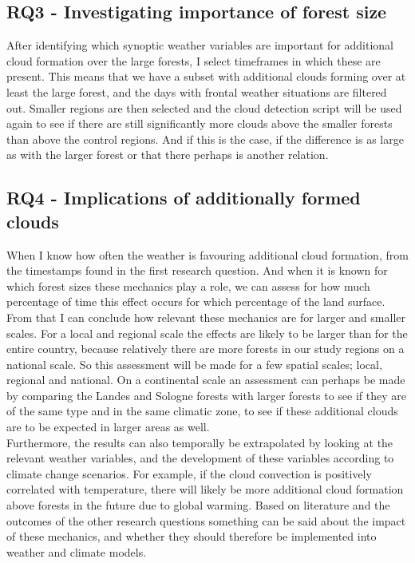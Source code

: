 \documentclass{article}
\begin{document}
\subsection{RQ3 - Investigating importance of forest size}
After identifying which synoptic weather variables are important for additional cloud formation over the large forests, I select timeframes in which these are present. This means that we have a subset with additional clouds forming over at least the large forest, and the days with frontal weather situations are filtered out. Smaller regions are then selected and the cloud detection script will be used again to see if there are still significantly more clouds above the smaller forests than above the control regions. And if this is the case, if the difference is as large as with the larger forest or that there perhaps is another relation.

\subsection{RQ4 - Implications of additionally formed clouds}
When I know how often the weather is favouring additional cloud formation, from the timestamps found in the first research question. And when it is known for which forest sizes these mechanics play a role, we can assess for how much percentage of time this effect occurs for which percentage of the land surface. From that I can conclude how relevant these mechanics are for larger and smaller scales. For a local and regional scale the effects are likely to be larger than for the entire country, because relatively there are more forests in our study regions on a national scale. So this assessment will be made for a few spatial scales; local, regional and national. On a continental scale an assessment can perhaps be made by comparing the Landes and Sologne forests with larger forests to see if they are of the same type and in the same climatic zone, to see if these additional clouds are to be expected in larger areas as well.\\

Furthermore, the results can also temporally be extrapolated by looking at the relevant weather variables, and the development of these variables according to climate change scenarios. For example, if the cloud convection is positively correlated with temperature, there will likely be more additional cloud formation above forests in the future due to global warming. Based on literature and the outcomes of the other research questions something can be said about the impact of these mechanics, and whether they should therefore be implemented into weather and climate models.\\
\end{document}
